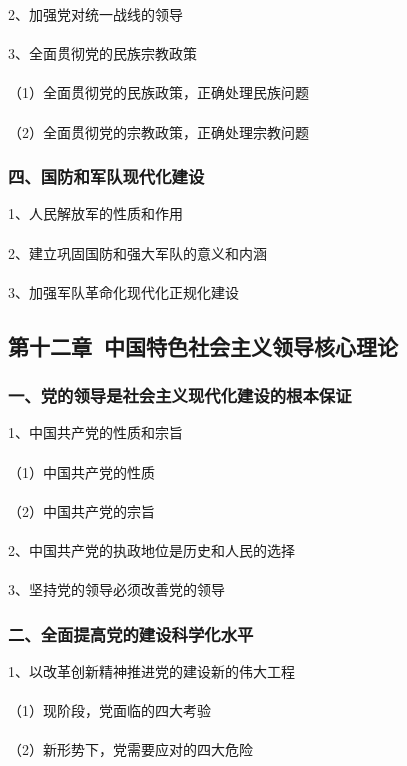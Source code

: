 \documentclass{ctexart}
\begin{document}
2、加强党对统一战线的领导
\\\\

3、全面贯彻党的民族宗教政策
\\\\
（1）全面贯彻党的民族政策，正确处理民族问题
\\\\
（2）全面贯彻党的宗教政策，正确处理宗教问题

\subsubsection{四、国防和军队现代化建设}
1、人民解放军的性质和作用
\\\\

2、建立巩固国防和强大军队的意义和内涵
\\\\

3、加强军队革命化现代化正规化建设

\subsection{第十二章\ 中国特色社会主义领导核心理论}
\subsubsection{一、党的领导是社会主义现代化建设的根本保证}
1、中国共产党的性质和宗旨
\\\\
（1）中国共产党的性质
\\\\
（2）中国共产党的宗旨
\\\\

2、中国共产党的执政地位是历史和人民的选择
\\\\

3、坚持党的领导必须改善党的领导
\subsubsection{二、全面提高党的建设科学化水平}
1、以改革创新精神推进党的建设新的伟大工程
\\\\
（1）现阶段，党面临的四大考验
\\\\
（2）新形势下，党需要应对的四大危险
\\\\
\end{document}
